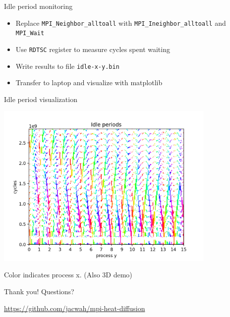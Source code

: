 \documentclass{beamer}
\begin{document}
\begin{frame}[fragile]{Idle period monitoring}
    \begin{itemize}
        \item Replace \verb|MPI_Neighbor_alltoall| with
            \verb|MPI_Ineighbor_alltoall| and \verb|MPI_Wait|
        \item Use \verb|RDTSC| register to measure cycles spent waiting
        \item Write results to file \verb|idle-x-y.bin|
        \item Transfer to laptop and visualize with matplotlib
    \end{itemize}
\end{frame}

\begin{frame}{Idle period visualization}
    \begin{center}
        \includegraphics[width=0.8\textwidth]{../idle.png}
    \end{center}
    Color indicates process x. (Also 3D demo)
\end{frame}

\begin{frame}{Thank you!}
    Questions?
    \bigskip

    \url{https://github.com/jacwah/mpi-heat-diffusion}
\end{frame}
\end{document}
